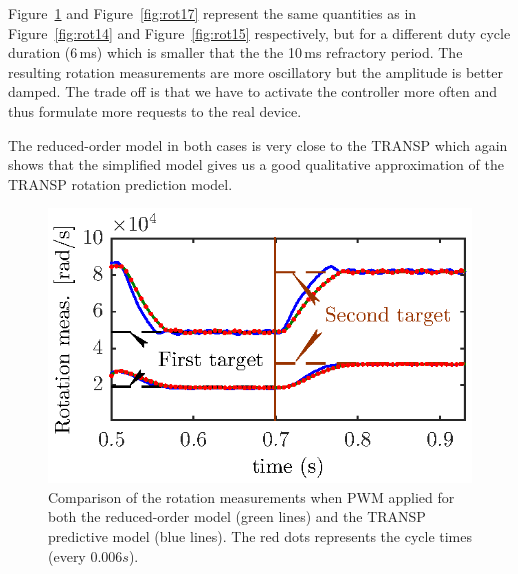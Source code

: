 \documentclass[12pt,lot, lof]{puthesis}
\begin{document}
Figure~\ref{fig:rot16} and Figure~\ref{fig:rot17} represent the same quantities as in Figure~\ref{fig:rot14} and Figure~\ref{fig:rot15} respectively, but for a different duty cycle duration (6\,ms) which is smaller that the the 10\,ms refractory period.
The resulting rotation measurements are more oscillatory but the amplitude is better damped. The trade off is that we have to activate the controller more often and thus formulate more requests to the real device.

The reduced-order model in both cases is very close to the TRANSP which again shows that the simplified model gives us a good qualitative approximation of the TRANSP rotation prediction model.

\begin{figure}
	\centering
	\includegraphics[width=0.8 \linewidth]{fig18}
	\caption{Comparison of the rotation measurements when PWM applied for both the reduced-order model (green lines) and the TRANSP predictive model (blue lines). The red dots represents the cycle times (every $0.006 s$).}
	\label{fig:rot16}
\end{figure}
\end{document}
